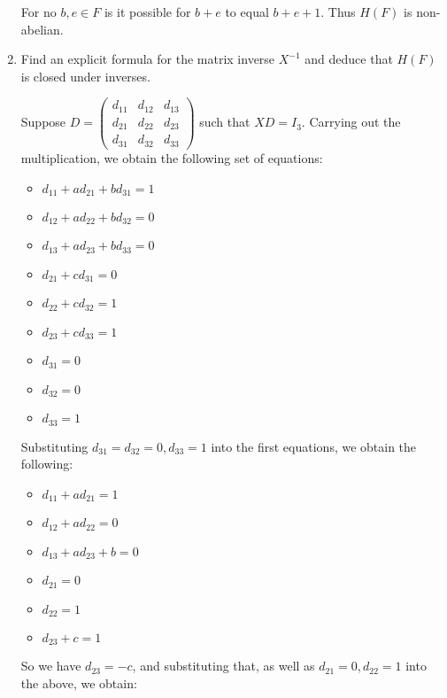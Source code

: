 \documentclass{article}
\begin{document}
\begin{enumerate}[label=(\alph*)]
          For no $b, e \in F$ is it possible for $b + e$ to equal $b + e + 1$. Thus $H(F)$ is non-abelian.

    \item Find an explicit formula for the matrix inverse $X^{-1}$ and deduce that $H(F)$ is closed under inverses.

          Suppose $D = \begin{pmatrix}d_{11} & d_{12} & d_{13} \\ d_{21} & d_{22} & d_{23} \\ d_{31} & d_{32} & d_{33}\end{pmatrix}$ such that $XD = I_3$. Carrying out the multiplication, we obtain the following set of equations:
          
          \begin{itemize}
            \item $d_{11} + ad_{21} + bd_{31} = 1$
            \item $d_{12} + ad_{22} + bd_{32} = 0$
            \item $d_{13} + ad_{23} + bd_{33} = 0$
            \item $d_{21} + cd_{31} = 0$
            \item $d_{22} + cd_{32} = 1$
            \item $d_{23} + cd_{33} = 1$
            \item $d_{31} = 0$
            \item $d_{32} = 0$
            \item $d_{33} = 1$
          \end{itemize}

          Substituting $d_{31} = d_{32} = 0, d_{33} = 1$ into the first equations, we obtain the following:

          \begin{itemize}
            \item $d_{11} + ad_{21} = 1$
            \item $d_{12} + ad_{22} = 0$
            \item $d_{13} + ad_{23} + b = 0$
            \item $d_{21} = 0$
            \item $d_{22} = 1$
            \item $d_{23} + c = 1$
          \end{itemize}

          So we have $d_{23} = -c$, and substituting that, as well as $d_{21} = 0, d_{22} = 1$ into the above, we obtain:


\end{enumerate}
\end{document}
